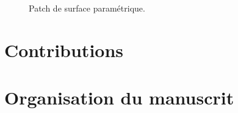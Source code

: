 \begin{figure}
\caption{Patch de surface paramétrique.}
\end{figure}


\section{Contributions}%


\section{Organisation du manuscrit}